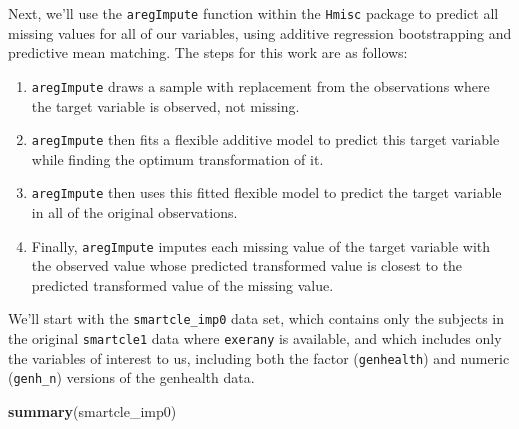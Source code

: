 \documentclass[]{book}
\newenvironment{Shaded}{\begin{snugshade}}{\end{snugshade}}
\newcommand{\KeywordTok}[1]{\textcolor[rgb]{0.13,0.29,0.53}{\textbf{#1}}}
\newcommand{\NormalTok}[1]{#1}
\providecommand{\tightlist}{%
  \setlength{\itemsep}{0pt}\setlength{\parskip}{0pt}}
\theoremstyle{definition}
\theoremstyle{definition}
\theoremstyle{definition}
\theoremstyle{remark}
\begin{document}
Next, we'll use the \texttt{aregImpute} function within the
\texttt{Hmisc} package to predict all missing values for all of our
variables, using additive regression bootstrapping and predictive mean
matching. The steps for this work are as follows:

\begin{enumerate}
\def\labelenumi{\arabic{enumi}.}
\tightlist
\item
  \texttt{aregImpute} draws a sample with replacement from the
  observations where the target variable is observed, not missing.
\item
  \texttt{aregImpute} then fits a flexible additive model to predict
  this target variable while finding the optimum transformation of it.
\item
  \texttt{aregImpute} then uses this fitted flexible model to predict
  the target variable in all of the original observations.
\item
  Finally, \texttt{aregImpute} imputes each missing value of the target
  variable with the observed value whose predicted transformed value is
  closest to the predicted transformed value of the missing value.
\end{enumerate}

We'll start with the \texttt{smartcle\_imp0} data set, which contains
only the subjects in the original \texttt{smartcle1} data where
\texttt{exerany} is available, and which includes only the variables of
interest to us, including both the factor (\texttt{genhealth}) and
numeric (\texttt{genh\_n}) versions of the genhealth data.

\begin{Shaded}
\begin{Highlighting}[]
\KeywordTok{summary}\NormalTok{(smartcle_imp0)}
\end{Highlighting}
\end{Shaded}
\end{document}
